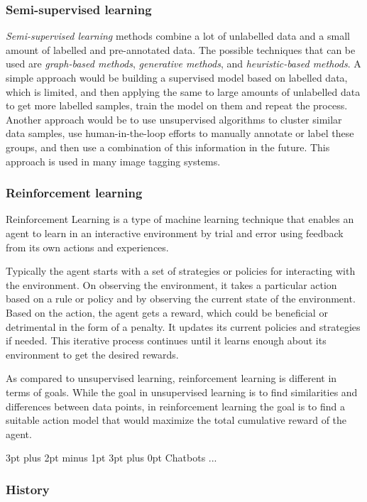 \documentclass[12pt,a4paper]{article}
\makeatletter
\renewcommand\subsection{\@startsection {subsection}{1}{2mm} %
                               {3pt plus 2pt minus 1pt} %
                               {3pt plus 0pt} %
                               {\normalfont\bfseries}}
\makeatother
\begin{document}
\subsubsection{Semi-supervised learning}
\textit{Semi-supervised learning} methods combine a lot of unlabelled data and a small amount of labelled and pre-annotated data. The possible techniques that can be used are \textit{graph-based methods}, \textit{generative methods}, and \textit{heuristic-based methods}. 
A simple approach would be building a supervised model based on labelled data, which is limited, and
then applying the same to large amounts of unlabelled data to get more labelled samples, train the model on them and repeat the process. Another approach would be to use unsupervised algorithms to cluster similar data samples, use human-in-the-loop efforts to manually annotate or label these groups, and then use a combination of this information in the future. This approach is used in many image tagging systems. 

\subsubsection{Reinforcement learning}
Reinforcement Learning is a type of machine learning technique that enables an agent to learn in an interactive environment by trial and error using feedback from its own actions and experiences. 

Typically the agent starts with a set of strategies or policies for interacting with the environment. On observing the environment, it takes a particular action based on a rule or policy and by observing the current state of the environment. Based on the action, the agent gets a reward, which could be beneficial or detrimental in the form of a penalty. It updates its current policies and strategies if needed. This iterative process continues until it learns enough about its environment to get the desired rewards. 

As compared to unsupervised learning, reinforcement learning is different in terms of goals. While the goal in unsupervised learning is to find similarities and differences between data points, in reinforcement learning the goal is to find a suitable action model that would maximize the total cumulative reward of the agent. 

\subsection{Chatbots}
...
\subsubsection{History}
\end{document}
